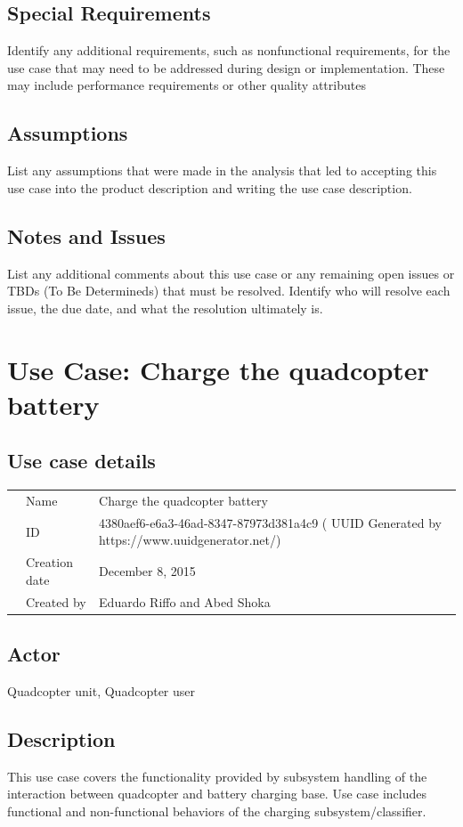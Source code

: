 \documentclass[a4paper]{article}
\begin{document}
\subsection{Special Requirements}
Identify any additional requirements, such as nonfunctional requirements, for the use case that may need to be addressed during design or implementation. These may include performance requirements or other quality attributes
\subsection{Assumptions}
List any assumptions that were made in the analysis that led to accepting this use case into the product description and writing the use case description.
\subsection{Notes and Issues}
List any additional comments about this use case or any remaining open issues or TBDs (To Be Determineds) that must be resolved. Identify who will resolve each issue, the due date, and what the resolution ultimately is.

\newpage
\section{Use Case: Charge the quadcopter battery}
\subsection{Use case details}

\begin{tabular}{lll}
	&Name  &Charge the quadcopter battery  \\
	&ID  &4380aef6-e6a3-46ad-8347-87973d381a4c9 ( UUID Generated by https://www.uuidgenerator.net/)  \\
	&Creation date  & December 8, 2015  \\
	&Created by  &Eduardo Riffo and Abed Shoka   
\end{tabular}

\subsection{Actor}
Quadcopter unit, Quadcopter user
\subsection{Description}
This use case covers the functionality provided by subsystem handling of the interaction between quadcopter and battery charging base. Use case includes functional and non-functional behaviors of the charging subsystem/classifier.
\end{document}
